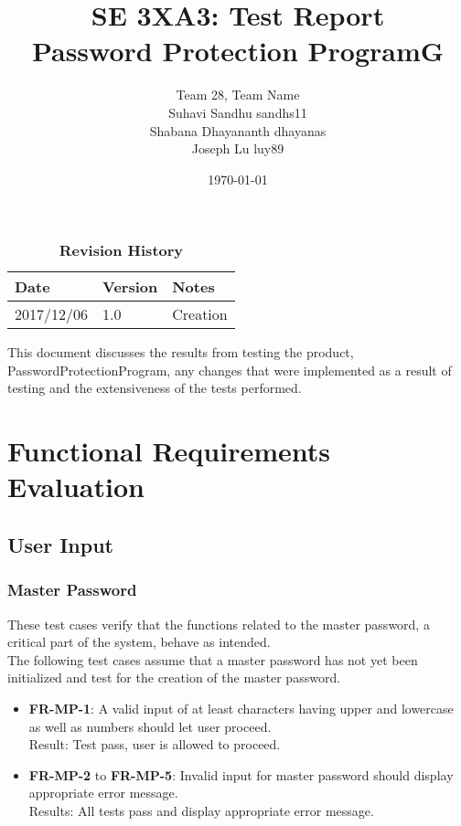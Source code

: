 \documentclass[12pt, titlepage]{article}
\title{SE 3XA3: Test Report\\Password Protection ProgramG}
\author{Team 28, Team Name
		\\ Suhavi Sandhu sandhs11
		\\ Shabana Dhayananth dhayanas
		\\ Joseph Lu luy89
}
\date{\today}
\begin{document}
\maketitle

\tableofcontents
\listoftables
\listoffigures

\begin{table}[bp]
\caption{\bf Revision History}
\begin{tabularx}{\textwidth}{p{3cm}p{2cm}X}
\toprule {\bf Date} & {\bf Version} & {\bf Notes}\\
\midrule
2017/12/06 & 1.0 & Creation\\
\bottomrule
\end{tabularx}
\end{table}

\newpage


This document discusses the results from testing the product, PasswordProtectionProgram, any changes that were implemented as a result of testing and the extensiveness of the tests performed.

\section{Functional Requirements Evaluation}

	\subsection{User Input}
	
		\subsubsection{Master Password}
			These test cases verify that the functions related to the master password, a critical part of the system, behave as intended.\\
			
			The following test cases assume that a master password has not yet been initialized and test for the creation of the master password.
			
			\begin{itemize}
			
				\item \textbf{FR-MP-1}: A valid input of at least characters having upper and lowercase as well as numbers should let user proceed.\\
				 Result: Test pass, user is allowed to proceed.
				 
				\item \textbf{FR-MP-2} to \textbf{FR-MP-5}: Invalid input for master password should display appropriate error message.\\
				 Results: All tests pass and display appropriate error message.
			
			\end{itemize}
			 
\end{document}
